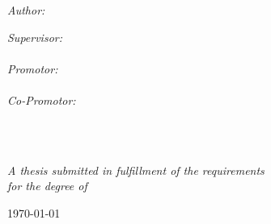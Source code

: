 \begin{titlepage}
    \begin{center}
    
    \vspace*{.06\textheight}
    {\scshape\LARGE \univname\par}\vspace{1.5cm} %
    
    {\huge \bfseries \ttitle\par}\vspace{0.4cm} %
    {\emph{\large \subjectname}}\vspace{2.4cm}
     
    \begin{minipage}[t]{0.4\textwidth}
    \begin{flushleft} \large
    \emph{Author:}\\
    \authorname %
    \end{flushleft}
    \end{minipage}
    \begin{minipage}[t]{0.4\textwidth}
    \begin{flushright} \large
    \emph{Supervisor:} \\
    \supervisorname\vspace{0.2cm} \\
    \emph{Promotor:} \\
    \promotor\vspace{0.2cm} \\
    \emph{Co-Promotor:} \\
    \copromotor \vspace{0.2cm} \\
    \end{flushright}
    \end{minipage}\\[3cm]
     
    \vfill
    
    \large \textit{A thesis submitted in fulfillment of the requirements\\ for the degree of \degreename}\\[0.3cm] %
     
    \vfill
    
    {\large \today}\\[4cm] %
     
    \vfill
    \end{center}
\end{titlepage}